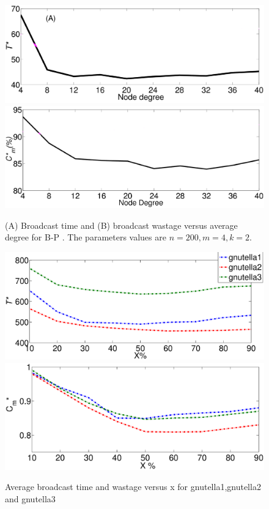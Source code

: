 \begin{figure}
\centering
\includegraphics[scale=0.21]{./texfiles/Chapter_3/netsci/figs1/random_graphs_delay1.eps}
\includegraphics[scale=0.21]{./texfiles/Chapter_3/netsci/figs1/random_graphs_wastage1.eps}
\caption{(A) Broadcast time and (B) broadcast wastage versus average degree for B-P . The parameters values are $n=200, m=4, k=2$.}
\label{DiffTopologyGnp_N200_varyD_push_pull}
\end{figure}
\begin{figure}
\centering
\includegraphics[scale=0.21]{./texfiles/Chapter_3/netsci/figs1/xperbt.eps}
\includegraphics[scale=0.21]{./texfiles/Chapter_3/netsci/figs1/xperwa.eps}
\caption{Average broadcast time and wastage versus x for gnutella1,gnutella2 and gnutella3}
\label{ps_bt}
\end{figure}

